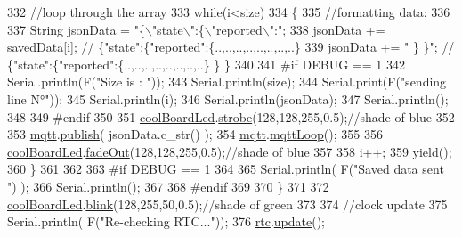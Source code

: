 \begin{DoxyCode}
332         \textcolor{comment}{//loop through the array}
333         \textcolor{keywordflow}{while}(i<size)
334         \{
335             \textcolor{comment}{//formatting data:}
336         
337             String jsonData = \textcolor{stringliteral}{"\{\(\backslash\)"state\(\backslash\)":\{\(\backslash\)"reported\(\backslash\)":"};
338             jsonData += savedData[i]; \textcolor{comment}{// \{"state":\{"reported":\{..,..,..,..,..,..,..,..\}}
339             jsonData += \textcolor{stringliteral}{" \} \}"}; \textcolor{comment}{// \{"state":\{"reported":\{..,..,..,..,..,..,..,..\}  \} \}}
340 
341 \textcolor{preprocessor}{        #if DEBUG == 1 }
342             Serial.println(F(\textcolor{stringliteral}{"Size is : "}));
343             Serial.println(size);
344             Serial.print(F(\textcolor{stringliteral}{"sending line N°"}));
345             Serial.println(i);
346             Serial.println(jsonData);
347             Serial.println();
348 
349 \textcolor{preprocessor}{        #endif}
350 
351             \hyperlink{class_cool_board_a1b1d3c684a5baa56b08486e192fd8e97}{coolBoardLed}.\hyperlink{class_cool_board_led_ad5f0de4c628cbfbf49896042831c64ad}{strobe}(128,128,255,0.5);\textcolor{comment}{//shade of blue}
352         
353             \hyperlink{class_cool_board_a2399f44d7c23c1149a335cb3b46d90f1}{mqtt}.\hyperlink{class_cool_m_q_t_t_ace977b3e90ab14b1199fe5c4fb0a13ec}{publish}( jsonData.c\_str() );
354             \hyperlink{class_cool_board_a2399f44d7c23c1149a335cb3b46d90f1}{mqtt}.\hyperlink{class_cool_m_q_t_t_aa5eaae967b562b62cbcf2b8d81f6e5d5}{mqttLoop}();
355         
356             \hyperlink{class_cool_board_a1b1d3c684a5baa56b08486e192fd8e97}{coolBoardLed}.\hyperlink{class_cool_board_led_a93d545679237e8cc858324367149775c}{fadeOut}(128,128,255,0.5);\textcolor{comment}{//shade of blue}
357             
358             i++;
359             yield();
360         \}       
361 
362 
363 \textcolor{preprocessor}{    #if DEBUG == 1}
364 
365         Serial.println( F(\textcolor{stringliteral}{"Saved data sent "}) );
366         Serial.println();
367     
368 \textcolor{preprocessor}{    #endif}
369 
370     \}
371 
372     \hyperlink{class_cool_board_a1b1d3c684a5baa56b08486e192fd8e97}{coolBoardLed}.\hyperlink{class_cool_board_led_a96e1ea13003eee34c9dbcef340404426}{blink}(128,255,50,0.5);\textcolor{comment}{//shade of green}
373 
374     \textcolor{comment}{//clock update}
375     Serial.println( F(\textcolor{stringliteral}{"Re-checking RTC..."}));
376     \hyperlink{class_cool_board_a50d2a6716879d64a85f3c6b44ad63275}{rtc}.\hyperlink{class_cool_time_aae601f795452cfa48d9fb337aed483a8}{update}();

\end{DoxyCode}
